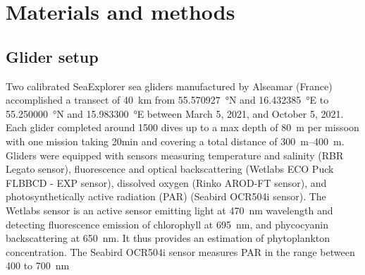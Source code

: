 \documentclass[../Main.tex]{subfiles}
\begin{document}
\section*{\crule[blue]{.3cm}{.3cm} Materials and methods}
\subsection*{\crule[blue]{.2cm}{.2cm} Glider setup}
Two calibrated SeaExplorer sea gliders manufactured by Alseamar (France) accomplished a transect of \SI{40}{km} from \SI{55.570927}{\degree}N and \SI{16.432385}{\degree}E to \SI{55.250000}{\degree}N and \SI{15.983300}{\degree}E between March 5, 2021, and October 5, 2021. 
Each glider completed around 1500 dives up to a max depth of \SI{80}{m} per missoon with one mission taking 20min and covering a total distance of \SIrange{300}{400}{m}.  
\\ 
Gliders were equipped with sensors measuring temperature and salinity (RBR Legato sensor), fluorescence and optical backscattering (Wetlabs ECO Puck FLBBCD - EXP sensor), dissolved oxygen (Rinko AROD-FT sensor), and photosynthetically active radiation (PAR) (Seabird OCR504i sensor). 
The Wetlabs sensor is an active sensor emitting light at \SI{470}{nm} wavelength and detecting fluorescence emission of chlorophyll at \SI{695}{nm}, and phycocyanin backscattering at \SI{650}{nm}. 
It thus provides an estimation of phytoplankton concentration. 
The Seabird OCR504i sensor measures PAR in the range between 400 to \SI{700}{nm}%
\end{document}
